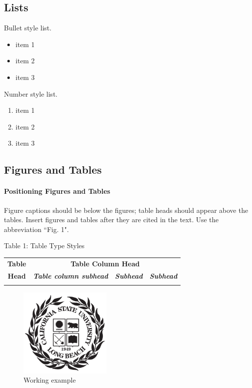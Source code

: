\documentclass{article}
\begin{document}
\subsection{Lists}
Bullet style list.
\begin{itemize}
\item item 1
\item item 2
\item item 3
\end{itemize}

Number style list.
\begin{enumerate}
\item item 1
\item item 2
\item item 3
\end{enumerate}

\subsection{Figures and Tables}
\paragraph{Positioning Figures and Tables} Figure captions should be below the figures; table heads should appear above the tables. Insert figures and tables after they are cited in the text. Use the abbreviation ``Fig. 1".
\begin{table}[!h]
\medskip
\begin{center}Table 1: Table Type Styles
\\\medskip\medskip
\begin{tabular}{|c||c|c|c|}
\hline \textbf{Table} & \multicolumn{3}{c|}{\textbf{Table Column Head}}\\
\cline{2-4} \textbf{Head} & \textbf{\textit{Table column subhead}} & \textbf{\textit{Subhead}} & \textbf{\textit{Subhead}}\\
\hline&&&\\
\hline
\end{tabular}
\end{center}
\end{table}

\begin{figure}[h!]
\centering
\includegraphics[width=0.4\textwidth]{fig1.png}
\caption{Working example}
\end{figure}
\end{document}
